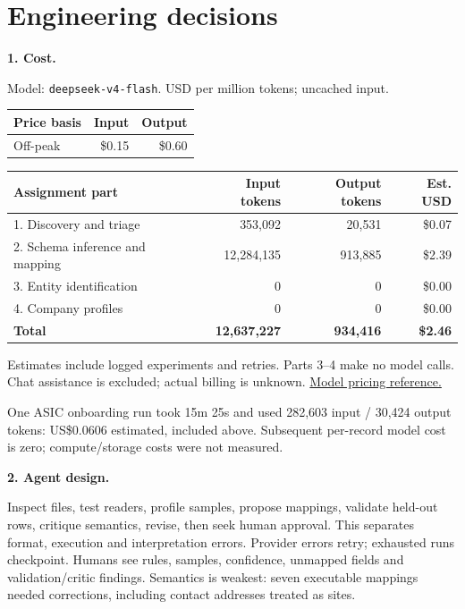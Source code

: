 \documentclass[10pt,a4paper]{article}
\begin{document}
\section{Engineering decisions}
\noindent\textbf{1. Cost.}\par
Model: \texttt{deepseek-v4-flash}. USD per million tokens; uncached input.\par
\begin{tabularx}{\linewidth}{@{}Xrr@{}}\toprule
Price basis & Input & Output \\\midrule
Off-peak & \$0.15 & \$0.60 \\
\bottomrule\end{tabularx}\par\vspace{4pt}
\begin{tabularx}{\linewidth}{@{}Xrrr@{}}\toprule
Assignment part & Input tokens & Output tokens & Est. USD \\\midrule
1. Discovery and triage & 353,092 & 20,531 & \$0.07 \\
2. Schema inference and mapping & 12,284,135 & 913,885 & \$2.39 \\
3. Entity identification & 0 & 0 & \$0.00 \\
4. Company profiles & 0 & 0 & \$0.00 \\
\midrule
\textbf{Total} & \textbf{12,637,227} & \textbf{934,416} & \textbf{\$2.46} \\
\bottomrule\end{tabularx}\par
Estimates include logged experiments and retries. Parts 3--4 make no model calls. Chat assistance is excluded; actual billing is unknown. \href{https://api-docs.deepseek.com/quick_start/pricing/}{Model pricing reference.}\par
One ASIC onboarding run took 15m 25s and used 282,603 input / 30,424 output tokens: US\$0.0606 estimated, included above. Subsequent per-record model cost is zero; compute/storage costs were not measured.\par
\vspace{4pt}
\noindent\textbf{2. Agent design.}\par
Inspect files, test readers, profile samples, propose mappings, validate held-out rows, critique semantics, revise, then seek human approval. This separates format, execution and interpretation errors. Provider errors retry; exhausted runs checkpoint. Humans see rules, samples, confidence, unmapped fields and validation/critic findings. Semantics is weakest: seven executable mappings needed corrections, including contact addresses treated as sites.\par
\end{document}
